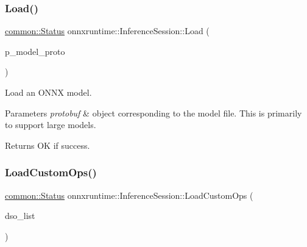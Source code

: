 \subsubsection{\texorpdfstring{Load()}{Load()}\hspace{0.1cm}{\footnotesize\ttfamily [4/4]}}
{\footnotesize\ttfamily \mbox{\hyperlink{classonnxruntime_1_1common_1_1Status}{common\+::\+Status}} onnxruntime\+::\+Inference\+Session\+::\+Load (\begin{DoxyParamCaption}\item[{std\+::unique\+\_\+ptr$<$ O\+N\+N\+X\+\_\+\+N\+A\+M\+E\+S\+P\+A\+C\+E\+::\+Model\+Proto $>$}]{p\+\_\+model\+\_\+proto }\end{DoxyParamCaption})\hspace{0.3cm}{\ttfamily [protected]}}

Load an O\+N\+NX model. 
\begin{DoxyParams}{Parameters}
{\em protobuf} & object corresponding to the model file. This is primarily to support large models. \\
\hline
\end{DoxyParams}
\begin{DoxyReturn}{Returns}
OK if success. 
\end{DoxyReturn}
\mbox{\label{classonnxruntime_1_1InferenceSession_a038b1a768eb597f03959867f3aa23bff}} 
\subsubsection{\texorpdfstring{Load\+Custom\+Ops()}{LoadCustomOps()}}
{\footnotesize\ttfamily \mbox{\hyperlink{classonnxruntime_1_1common_1_1Status}{common\+::\+Status}} onnxruntime\+::\+Inference\+Session\+::\+Load\+Custom\+Ops (\begin{DoxyParamCaption}\item[{const std\+::vector$<$ std\+::string $>$ \&}]{dso\+\_\+list }\end{DoxyParamCaption})}


